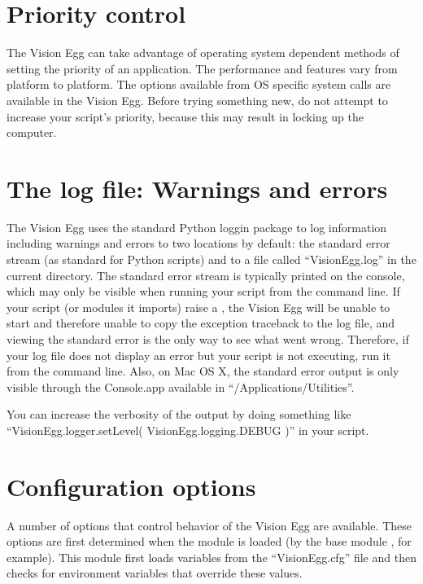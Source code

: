 \documentclass{manual}
\begin{document}
\section{Priority control}

The Vision Egg can take advantage of operating system dependent
methods of setting the priority of an application.  The performance
and features vary from platform to platform.  The options available
from OS specific system calls are available in the Vision Egg.  Before
trying something new, do not attempt to increase your script's
priority, because this may result in locking up the computer.

\section{The log file: Warnings and errors}

The Vision Egg uses the standard Python loggin package to log
information including warnings and errors to two locations by default:
the standard error stream (as standard for Python scripts) and to a
file called ``VisionEgg.log'' in the current directory.  The standard
error stream is typically printed on the console, which may only be
visible when running your script from the command line.  If your
script (or modules it imports) raise a
, the Vision Egg will be unable to start and
therefore unable to copy the exception traceback to the log file, and
viewing the standard error is the only way to see what went wrong.
Therefore, if your log file does not display an error but your script
is not executing, run it from the command line.  Also, on Mac OS X,
the standard error output is only visible through the Console.app
available in ``/Applications/Utilities''.

You can increase the verbosity of the output by doing something like
``VisionEgg.logger.setLevel( VisionEgg.logging.DEBUG )'' in your
script.

\section{Configuration options}

A number of options that control behavior of the Vision Egg are
available.  These options are first determined when the
 module is loaded (by the base module
, for example).  This module first loads variables
from the ``VisionEgg.cfg'' file and then checks for environment
variables that override these values.
\end{document}
